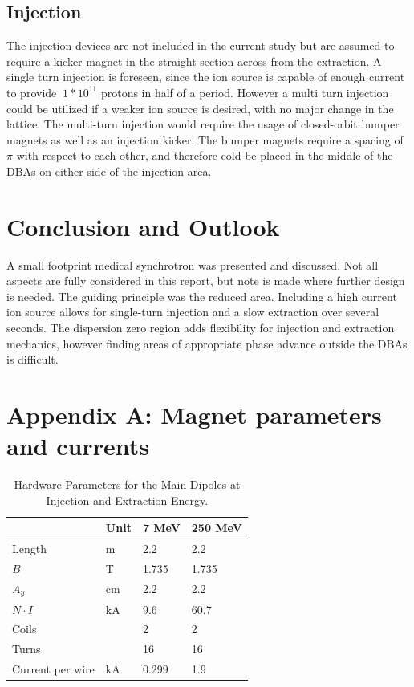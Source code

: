 \subsection{Injection} 
The injection devices are not included in the current study but are assumed to require a kicker magnet in the straight section across from the extraction.  
A single turn injection is foreseen, since the ion source is capable of enough current to provide $~1*10^{11}$ protons in half of a period.
However a multi turn injection could be utilized if a weaker ion source is desired, with no major change in the lattice. The
multi-turn injection would require the usage of closed-orbit bumper magnets as well as an injection kicker.  The bumper magnets require a spacing of $\pi$ with respect
to each other, and therefore cold be placed in the middle of the DBAs on either side of the injection area.   
 
\section{Conclusion and Outlook} 
A small footprint medical synchrotron was presented and discussed.  Not all aspects are fully considered in this report, but note is made where further
design is needed.  The guiding principle was the reduced area.  Including a high current ion source allows for single-turn injection and a slow extraction over several
seconds.  The dispersion zero region adds flexibility for injection and extraction mechanics, however finding areas of appropriate phase advance outside the DBAs is 
difficult.  
 
\section{Appendix A: Magnet parameters and currents} 

\begin{table}[]
  \caption{Hardware Parameters for the Main Dipoles at Injection and Extraction Energy.}
  \centering
  \begin{tabular}{@{}llll@{}}
          \toprule
          & \textbf{Unit} & \textbf{7 MeV} & \textbf{250 MeV} \\ 
          \hline \hline

          Length           & m    & 2.2   & 2.2     \\
          $B$              & T    & 1.735 & 1.735   \\
          $A_y$            & cm   & 2.2   & 2.2     \\
          $N \cdot I$      & kA   & 9.6   & 60.7    \\
          Coils            &      & 2     & 2       \\
          Turns            &      & 16    & 16      \\
          Current per wire & kA   & 0.299 & 1.9     \\ \bottomrule
        \end{tabular}
      \end{table}
      \label{tab:bend}

